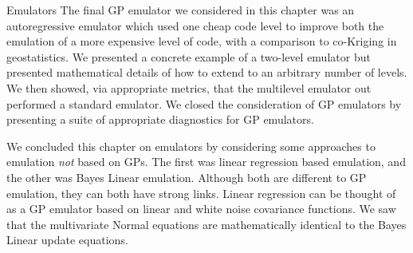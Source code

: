 \begin{chapter}{Emulators \label{Ch:Emulators}}
The final GP emulator we considered in this chapter was an autoregressive emulator which used one cheap code level to improve both the emulation of a more expensive level of code, with a comparison to co-Kriging in geostatistics. We presented a concrete example of a two-level emulator but presented mathematical details of how to extend to an arbitrary number of levels. We then showed, via appropriate metrics, that the multilevel emulator out performed a standard emulator. We closed the consideration of GP emulators by presenting a suite of appropriate diagnostics for GP emulators.

We concluded this chapter on emulators by considering some approaches to emulation \textit{not} based on GPs. The first was linear regression based emulation, and the other was Bayes Linear emulation. Although both are different to GP emulation, they can both have strong links. Linear regression can be thought of as a GP emulator based on linear and white noise covariance functions. We saw that the multivariate Normal equations are mathematically identical to the Bayes Linear update equations.
\end{chapter}
